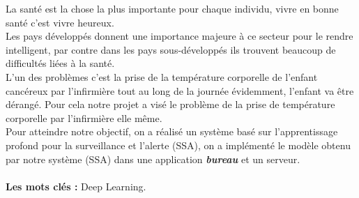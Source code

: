 \documentclass[12pt]{article}
\begin{document}
\begin{resume}
	La sant\'e est la chose la plus importante pour chaque individu, vivre en bonne sant\' e c'est vivre heureux.\\
	Les pays d\'evelopp\'es donnent une importance majeure \`a ce secteur pour le rendre intelligent, par contre dans les pays sous-d\' evelopp\' es ils trouvent beaucoup de difficult\' es li\'ees \`a la sant\'e. \\
	
	L'un des probl\`emes c'est la prise de la temp\' erature corporelle de l'enfant canc\' ereux par l'infirmi\`ere tout au long de la journ\' ee \' evidemment, l'enfant va \^ etre d\' erang\' e. Pour cela notre projet a vis\' e le probl\`eme de la prise de temp\' erature corporelle par l'infirmi\`ere elle m\^ eme.\\



	
	Pour atteindre notre  objectif, on a r\' ealis\' e  un syst\` eme bas\' e sur  l'apprentissage  profond pour  la surveillance et l'alerte (SSA), on a impl\' ement\' e le mod\` ele obtenu par notre syst\` eme (SSA) dans une application \textit{\textbf{bureau}} et un serveur.\\ \\

\textbf{Les mots cl\' es :} Deep Learning.
\end{resume}
\end{document}
